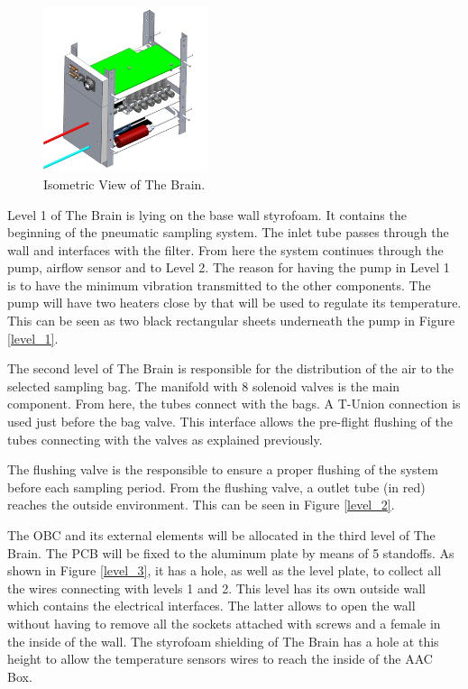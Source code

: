 \begin{figure}[H]
    \centering
    \includegraphics[width=0.43\textwidth]{4-experiment-design/img/Mechanical/The_Brain_Isometric.png}
    \caption{Isometric View of The Brain.}
    \label{brain_isometric_open}
\end{figure}
Level 1 of The Brain is lying on the base wall styrofoam. It contains the beginning of the pneumatic sampling system. The inlet tube passes through the wall and interfaces with the filter. From here the system continues through the pump, airflow sensor and to Level 2. The reason for having the pump in Level 1 is to have the minimum vibration transmitted to the other components. The pump will have two heaters close by that will be used to regulate its temperature. This can be seen as two black rectangular sheets underneath the pump in Figure \ref{level_1}.

The second level of The Brain is responsible for the distribution of the air to the selected sampling bag. The manifold with 8 solenoid valves is the main component. From here, the tubes connect with the bags. A T-Union connection is used just before the bag valve. This interface allows the pre-flight flushing of the tubes connecting with the valves as explained previously. 

\smallskip
The flushing valve is the responsible to ensure a proper flushing of the system before each sampling period. From the flushing valve, a outlet tube (in red) reaches the outside environment. This can be seen in Figure \ref{level_2}.

The OBC and its external elements will be allocated in the third level of The Brain. The PCB will be fixed to the aluminum plate by means of 5 standoffs. As shown in Figure \ref{level_3}, it has a hole, as well as the level plate, to collect all the wires connecting with levels 1 and 2. This level has its own outside wall which contains the electrical interfaces. The latter allows to open the wall without having to remove all the sockets attached with screws and a female in the inside of the wall. The styrofoam shielding of The Brain has a hole at this height to allow the temperature sensors wires to reach the inside of the AAC Box. 

